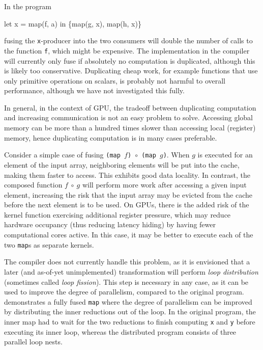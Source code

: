 \begin{description}[style=nextline]
\item[Computation may be duplicated.]

In the program
\begin{colorcode}
let x = map(f, a) in
\{map(g, x), map(h, x)\}
\end{colorcode}
fusing the \texttt{x}-producer into the two consumers will double the
number of calls to the function \texttt{f}, which might be expensive.
The implementation in the \LO{} compiler will currently only fuse if
absolutely no computation is duplicated, although this is likely too
conservative.  Duplicating cheap work, for example functions that use
only primitive operations on scalars, is probably not harmful to
overall performance, although we have not investigated this
fully.

In general, in the context of GPU, the tradeoff between duplicating
computation and increasing communication is not an easy problem to
solve.  Accessing global memory can be more than a hundred times
slower than accessing local (register) memory, hence duplicating
computation is in many cases preferable.

\item[Can reduce memory locality.]

  Consider a simple case of fusing
  \texttt{(map~$f$)~$\circ$~(map~$g$)}.  When $g$ is executed for an
  element of the input array, neighboring elements will be put into
  the cache, making them faster to access.  This exhibits good data
  locality.  In contrast, the composed function $f~\circ~g$ will
  perform more work after accessing a given input element, increasing
  the risk that the input array may be evicted from the cache before
  the next element is to be used.  On GPUs, there is the added risk of
  the kernel function exercising additional register pressure, which
  may reduce hardware occupancy (thus reducing latency hiding) by
  having fewer computational cores active.  In this case, it may be
  better to execute each of the two \texttt{map}s as separate kernels.

  The \LO{} compiler does not currently handle this problem, as it is
  envisioned that a later (and as-of-yet unimplemented) transformation
  will perform \textit{loop distribution} (sometimes called
  \textit{loop fission}).  This step is necessary in any case, as it
  can be used to improve the degree of parallelism, compared to the
  original program.   demonstrates a fully
  fused \texttt{map} where the degree of parallelism can be improved
  by distributing the inner reductions out of the loop.  In the
  original program, the inner map had to wait for the two reductions
  to finish computing \texttt{x} and \texttt{y} before executing its
  inner loop, whereas the distributed program consists of three
  parallel loop nests.
\end{description}

